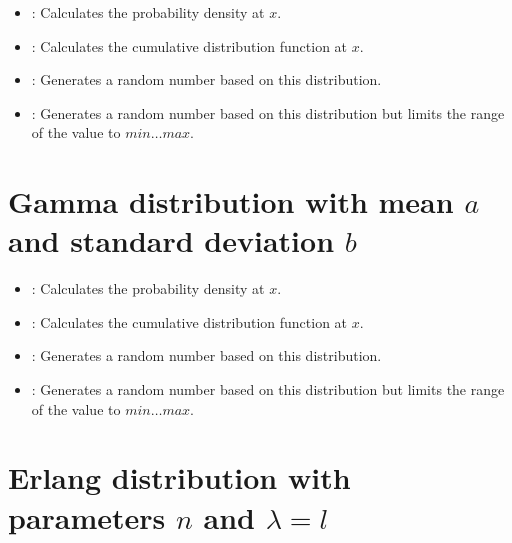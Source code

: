 \begin{itemize}

\item
{}:
Calculates the probability density at $x$.

\item
{}:
Calculates the cumulative distribution function at $x$.

\item
{}:
Generates a random number based on this distribution.

\item
{}:
Generates a random number based on this distribution but limits the range of the value to $min\ldots max$.

\end{itemize}



\section{Gamma distribution with mean \texorpdfstring{$a$}{a} and standard deviation \texorpdfstring{$b$}{b}}

\begin{itemize}

\item
{}:
Calculates the probability density at $x$.

\item
{}:
Calculates the cumulative distribution function at $x$.

\item
{}:
Generates a random number based on this distribution.

\item
{}:
Generates a random number based on this distribution but limits the range of the value to $min\ldots max$.

\end{itemize}



\section{Erlang distribution with parameters \texorpdfstring{$n$}{n} and \texorpdfstring{$\lambda=l$}{l}}

